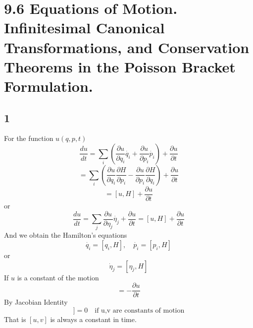 \documentclass[12pt]{article}
\begin{document}
	\section*{9.6 Equations of Motion. Infinitesimal Canonical Transformations, and Conservation Theorems in the Poisson Bracket Formulation.}
	
	\subsection*{1}
	For the function $u(q, p, t)$
	\begin{equation*}
		\frac{du}{dt} = \sum_i \left( \frac{\partial u}{\partial q_i}\dot{q_i} + \frac{\partial u}{\partial p_i}\dot{p_i} \right) + \frac{\partial u}{\partial t}
	\end{equation*}
	\begin{equation*}
		= \sum_i \left( \frac{\partial u}{\partial q_i}\frac{\partial H}{\partial p_i} - \frac{\partial u}{\partial p_i}\frac{\partial H}{\partial q_i} \right) + \frac{\partial u}{\partial t}
	\end{equation*}
	\begin{equation*}
		= [u, H] + \frac{\partial u}{\partial t}
	\end{equation*}
	or
	\begin{equation*}
		\frac{du}{dt} = \sum_j \frac{\partial u}{\partial \eta_j} \dot{\eta_j} + \frac{\partial u}{\partial t} = [u, H] + \frac{\partial u}{\partial t}
	\end{equation*}
	And we obtain the Hamilton's equations
	\begin{equation*}
		\dot{q_i} = [q_i, H], \quad \dot{p_i} = [p_i, H]
	\end{equation*}
	or
	\begin{equation*}
		\dot{\eta}_j = [\eta_j, H]
	\end{equation*}
	If $u$ is a constant of the motion
	\begin{equation*}
		[H, u] = -\frac{\partial u}{\partial t}
	\end{equation*}
	By Jacobian Identity
	\begin{equation*}
		[H, [u, v]] = 0 \quad \text{if u,v are constants of motion}
	\end{equation*}
	That is $[u, v]$ is always a constant in time.
	
\end{document}
